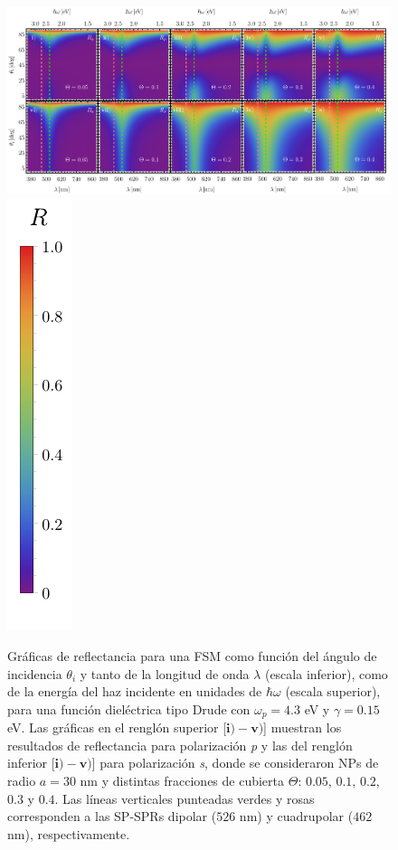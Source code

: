 	\begin{figure}[h!]\centering
\includegraphics[width = .9\linewidth	]{2-Resultados/figs/4-Wp4FSMThetaVar/0-2D_Grid.png}%
\includegraphics[scale=.85, trim={00 -5 00 00}, clip]{2-Resultados/figs/0-RBar_v}\vspace*{-1em}
	\caption{Gráficas de reflectancia para una FSM como función del ángulo de incidencia $\theta_i$ y tanto de la longitud de onda $\lambda$ (escala inferior), como de la energía del haz incidente en unidades de $\hbar\omega$ (escala superior), para una función dieléctrica tipo Drude con $\omega_p=4. 3$ eV  y  $\gamma=0. 15$ eV.  Las gráficas   en el renglón superior [$\mathbf{i)-v)}$]  muestran los resultados de reflectancia para  polarización \emph{p} y las del renglón inferior  [$\mathbf{i)-v)}$] para polarización  \emph{s}, donde se consideraron NPs de radio $a=30$ nm y distintas fracciones de cubierta $\Theta$: $0. 05$, $0. 1$, $0. 2$, $0. 3$ y $0. 4$. Las líneas verticales punteadas verdes y rosas corresponden a las SP-SPRs dipolar ($526$ nm) y cuadrupolar ($462$ nm), respectivamente.}	\label{fig:R-FSM}	
	\end{figure}						
					

